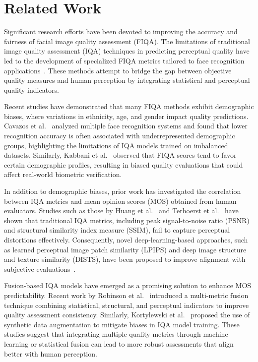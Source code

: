 \section{Related Work}

Significant research efforts have been devoted to improving the accuracy and fairness of facial image quality assessment (FIQA). The limitations of traditional image quality assessment (IQA) techniques in predicting perceptual quality have led to the development of specialized FIQA metrics tailored to face recognition applications~\cite{Terhoerst2020, Babnik2022}. These methods attempt to bridge the gap between objective quality measures and human perception by integrating statistical and perceptual quality indicators.

Recent studies have demonstrated that many FIQA methods exhibit demographic biases, where variations in ethnicity, age, and gender impact quality predictions. Cavazos et al.~\cite{Cavazos2021} analyzed multiple face recognition systems and found that lower recognition accuracy is often associated with underrepresented demographic groups, highlighting the limitations of IQA models trained on imbalanced datasets. Similarly, Kabbani et al.~\cite{Kabbani2024} observed that FIQA scores tend to favor certain demographic profiles, resulting in biased quality evaluations that could affect real-world biometric verification.

In addition to demographic biases, prior work has investigated the correlation between IQA metrics and mean opinion scores (MOS) obtained from human evaluators. Studies such as those by Huang et al.~\cite{Huang2020} and Terhoerst et al.~\cite{Terhoerst2020} have shown that traditional IQA metrics, including peak signal-to-noise ratio (PSNR) and structural similarity index measure (SSIM), fail to capture perceptual distortions effectively. Consequently, novel deep-learning-based approaches, such as learned perceptual image patch similarity (LPIPS) and deep image structure and texture similarity (DISTS), have been proposed to improve alignment with subjective evaluations~\cite{Babnik2022}.

Fusion-based IQA models have emerged as a promising solution to enhance MOS predictability. Recent work by Robinson et al.~\cite{Robinson2020} introduced a multi-metric fusion technique combining statistical, structural, and perceptual indicators to improve quality assessment consistency. Similarly, Kortylewski et al.~\cite{Kortylewski2019} proposed the use of synthetic data augmentation to mitigate biases in IQA model training. These studies suggest that integrating multiple quality metrics through machine learning or statistical fusion can lead to more robust assessments that align better with human perception.

